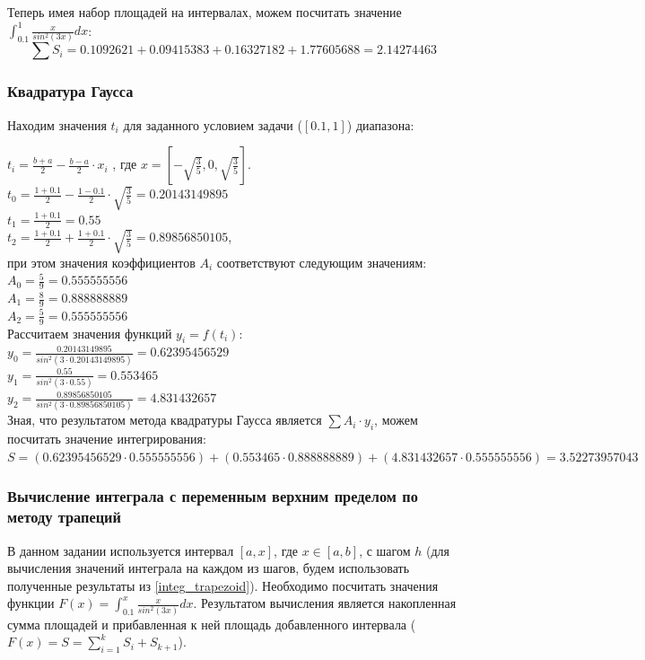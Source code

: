 \documentclass{article}
\begin{document}
Теперь имея набор площадей на интервалах, можем посчитать значение  
$\int_{0.1}^1 \frac{x}{sin^2(3x)}dx$:\\
\begin{displaymath} 
  \sum S_{i} = 0.1092621 + 0.09415383 + 0.16327182 + 1.77605688 = 2.14274463
\end{displaymath}

\subsubsection{Квадратура Гаусса}
Находим значения $t_{i}$ для заданного условием задачи ($[0.1, 1]$) диапазона:

$t_{i} = \frac{b + a}{2} - \frac{b - a}{2} \cdot x_{i}$ , где 
$x = [-\sqrt{\frac{3}{5}}, 0, \sqrt{\frac{3}{5}}]$.\\
$t_{0} = \frac{1 + 0.1}{2} - \frac{1 - 0.1}{2} \cdot \sqrt{\frac{3}{5}}
= 0.20143149895$ \\
$t_{1} = \frac{1 + 0.1}{2} = 0.55$  \\
$t_{2} = \frac{1 + 0.1}{2} + \frac{1 + 0.1}{2} \cdot \sqrt{\frac{3}{5}}
= 0.89856850105$, \\
при этом значения коэффициентов $A_{i}$ соответствуют следующим значениям: \\
$A_{0} = \frac{5}{9} = 0.555555556 $\\
$A_{1} = \frac{8}{9} = 0.888888889 $\\
$A_{2} = \frac{5}{9} = 0.555555556 $\\

Рассчитаем значения функций $y_{i} = f(t_{i})$: \\
$y_{0} = \frac{0.20143149895}{sin^2(3 \cdot 0.20143149895)} = 0.62395456529$\\
$y_{1} = \frac{0.55}{sin^2(3 \cdot 0.55)} = 0.553465$ \\
$y_{2} = \frac{0.89856850105}{sin^2(3 \cdot 0.89856850105)} = 4.831432657 $\\

Зная, что результатом метода квадратуры Гаусса является $\sum A_{i} \cdot
y_{i}$, можем посчитать значение интегрирования: \\

$S = (0.62395456529 \cdot 0.555555556) 
   + (0.553465 \cdot 0.888888889) 
   + (4.831432657 \cdot 0.555555556)
   = 3.52273957043
$

\subsubsection{Вычисление интеграла с переменным верхним пределом по методу
трапеций}
В данном задании используется интервал $[a, x]$, где $x \in [a, b]$, с шагом
$h$ (для вычисления значений интеграла на каждом из шагов, будем использовать
полученные результаты из \ref{integ_trapezoid}). 
Необходимо посчитать значения функции $F(x) = \int_{0.1}^x
\frac{x}{sin^2(3x)}dx$. Результатом вычисления является накопленная сумма
площадей и прибавленная к ней площадь добавленного
интервала ($F(x) = S = \sum\limits_{i=1}^k S_i + S_{k+1}$).\\
\end{document}
